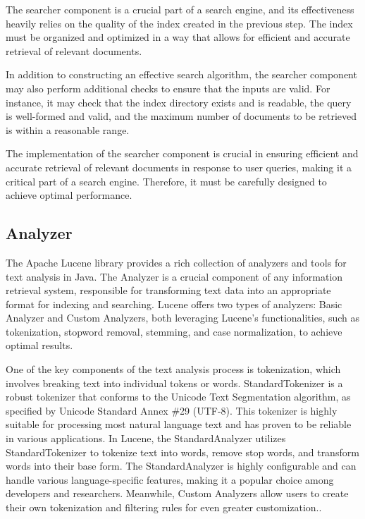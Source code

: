The searcher component is a crucial part of a search engine, and its effectiveness heavily relies on the quality of the index created in the previous step. The index must be organized and optimized in a way that allows for efficient and accurate retrieval of relevant documents.

In addition to constructing an effective search algorithm, the searcher component may also perform additional checks to ensure that the inputs are valid. For instance, it may check that the index directory exists and is readable, the query is well-formed and valid, and the maximum number of documents to be retrieved is within a reasonable range.

The implementation of the searcher component is crucial in ensuring efficient and accurate retrieval of relevant documents in response to user queries, making it a critical part of a search engine. Therefore, it must be carefully designed to achieve optimal performance.

\subsection{Analyzer}
The Apache Lucene library provides a rich collection of analyzers and tools for text analysis in Java. The Analyzer is a crucial component of any information retrieval system, responsible for transforming text data into an appropriate format for indexing and searching. Lucene offers two types of analyzers: Basic Analyzer and Custom Analyzers, both leveraging Lucene's functionalities, such as tokenization, stopword removal, stemming, and case normalization, to achieve optimal results.

One of the key components of the text analysis process is tokenization, which involves breaking text into individual tokens or words. StandardTokenizer is a robust tokenizer that conforms to the Unicode Text Segmentation algorithm, as specified by Unicode Standard Annex \#29 (UTF-8)\cite{unicode2020unicode}. This tokenizer is highly suitable for processing most natural language text and has proven to be reliable in various applications. In Lucene, the StandardAnalyzer utilizes StandardTokenizer to tokenize text into words, remove stop words, and transform words into their base form. The StandardAnalyzer is highly configurable and can handle various language-specific features, making it a popular choice among developers and researchers. Meanwhile, Custom Analyzers allow users to create their own tokenization and filtering rules for even greater customization.\cite{gospodnetic2021lucene}.

